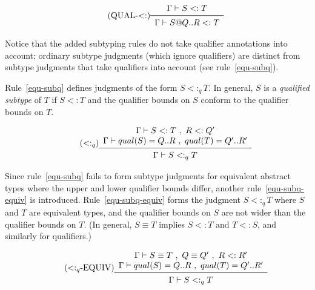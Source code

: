 \vspace{0.4cm}

\begin{equation*}\tag{QUAL-$<:$}\label{equ-qual-subtype}
\begin{array}{c}
\Gamma \vdash S <: T \\
\midrule
\Gamma \vdash S@Q..R <: T \\
\end{array}
\end{equation*}

\vspace{0.4cm}

Notice that the added subtyping rules do not take qualifier annotations into account;
ordinary subtype judgments (which ignore qualifiers) are distinct from
subtype judgments that take qualifiers into account (see rule~\ref{equ-subq}).

Rule~\ref{equ-subq} defines judgments of the form \mbox{$S <:_q T$}.
In general, $S$ is a {\em qualified subtype} of $T$ if \mbox{$S <: T$} and
the qualifier bounds on $S$ conform to the qualifier bounds on $T$.

\begin{equation*}\tag{$<:_q$}\label{equ-subq}
\begin{array}{c}
\Gamma \vdash S <: T\ ,\ R<:Q' \\
\Gamma \vdash qual(S)=Q..R\ ,\ qual(T)=Q'..R' \\
\midrule
\Gamma \vdash S <:_q T \\
\end{array}
\end{equation*}

\vspace{0.4cm}

Since rule~\ref{equ-subq} fails to form subtype judgments for
equivalent abstract types where the upper and lower qualifier bounds
differ, another rule~\ref{equ-subq-equiv} is introduced.
Rule~\ref{equ-subq-equiv} forms the judgment \mbox{$S <:_q T$}
where $S$ and $T$ are equivalent types, and the qualifier bounds on $S$
are not wider than the qualifier bounds on $T$.
(In general, \mbox{$S \equiv T$} implies \mbox{$S <: T$} and \mbox{$T <: S$},
and similarly for qualifiers.)

\begin{equation*}\tag{$<:_q$-EQUIV}\label{equ-subq-equiv}
\begin{array}{c}
\Gamma \vdash S \equiv T\ ,\ Q \equiv Q'\ ,\ R <: R' \\
\Gamma \vdash qual(S)=Q..R\ ,\ qual(T)=Q'..R' \\
\midrule
\Gamma \vdash S <:_q T \\
\end{array}
\end{equation*}


